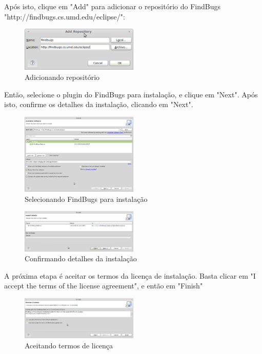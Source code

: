 \documentclass[12pt,journal,compsoc]{IEEEtran}
\begin{document}
Após isto, clique em "Add" para adicionar o repositório do FindBugs "http://findbugs.cs.umd.edu/eclipse/":

\begin{figure}[ht!]
\centering
\includegraphics[width=0.5\textwidth]{img/eclipse-findbugs-02}
\caption{Adicionando repositório}
\label{eclipse-findbugs-02}
\end{figure} 

Então, selecione o plugin do FindBugs para instalação, e clique em "Next". Após isto, confirme os detalhes da instalação, clicando em "Next".

\begin{figure}[ht!]
\centering
\includegraphics[width=0.5\textwidth]{img/eclipse-findbugs-03}
\caption{Selecionando FindBugs para instalação}
\label{eclipse-findbugs-03}
\end{figure} 

\begin{figure}[ht!]
\centering
\includegraphics[width=0.5\textwidth]{img/eclipse-findbugs-04}
\caption{Confirmando detalhes da instalação}
\label{eclipse-findbugs-04}
\end{figure} 

A próxima etapa é aceitar os termos da licença de instalação. Basta clicar em "I accept the terms of the license agreement", e então em "Finish"

\begin{figure}[ht!]
\centering
\includegraphics[width=0.5\textwidth]{img/eclipse-findbugs-05}
\caption{Aceitando termos de licença}
\label{eclipse-findbugs-05}
\end{figure} 
\end{document}
